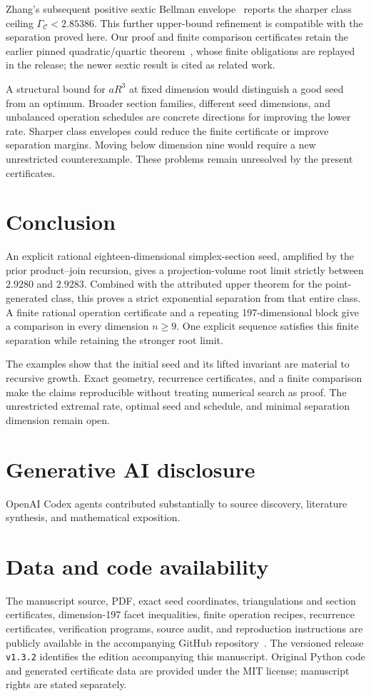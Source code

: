 \documentclass[11pt]{article}
\newcommand{\CC}{\mathcal C}
\begin{document}
Zhang's subsequent positive sextic Bellman envelope~\cite{mxym-sextic}
reports the sharper class ceiling $\Gamma_{\CC}<2.85386$. This further
upper-bound refinement is compatible with the separation proved here.
Our proof and finite comparison certificates retain the earlier pinned
quadratic/quartic theorem~\cite{mxym-upper}, whose finite obligations are
replayed in the release; the newer sextic result is cited as related work.

A structural bound for $aR^3$ at fixed dimension would distinguish a
good seed from an optimum. Broader section families, different seed
dimensions, and unbalanced operation schedules are concrete directions
for improving the lower rate. Sharper class envelopes could reduce the
finite certificate or improve separation margins. Moving below dimension
nine would require a new unrestricted counterexample. These problems
remain unresolved by the present certificates.

\section{Conclusion}
An explicit rational eighteen-dimensional simplex-section seed, amplified by the prior
product--join recursion, gives a projection-volume root limit strictly
between $2.9280$ and $2.9283$. Combined with the attributed upper theorem
for the point-generated class, this proves a strict exponential
separation from that entire class. A finite rational operation
certificate and a repeating 197-dimensional block give a comparison in
every dimension $n\ge9$. One explicit sequence satisfies this finite
separation while retaining the stronger root limit.

The examples show that the initial seed and its lifted invariant are
material to recursive growth. Exact geometry, recurrence certificates,
and a finite comparison make the claims reproducible without treating
numerical search as proof. The unrestricted extremal rate, optimal seed
and schedule, and minimal separation dimension remain open.

\section*{Generative AI disclosure}
OpenAI Codex agents contributed substantially to source discovery,
literature synthesis, and mathematical exposition.

\section*{Data and code availability}
The manuscript source, PDF, exact seed coordinates, triangulations and section certificates,
dimension-197 facet inequalities, finite operation recipes, recurrence certificates,
verification programs, source audit, and reproduction instructions are
publicly available in the accompanying GitHub repository~\cite{data}.
The versioned release \texttt{v1.3.2} identifies the edition accompanying
this manuscript. Original Python code and generated certificate data are
provided under the MIT license; manuscript rights are stated separately.
\end{document}
